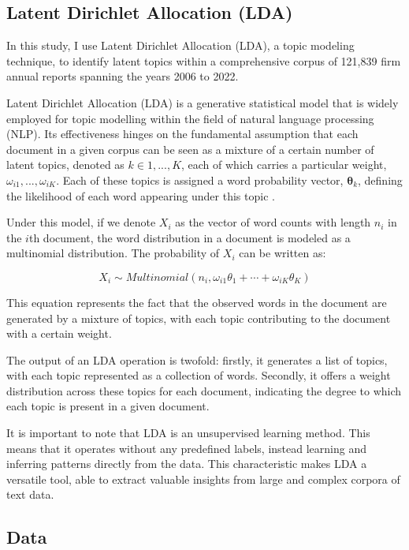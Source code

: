 \documentclass[12pt, letterpaper]{article}
\begin{document}
\subsection{Latent Dirichlet Allocation (LDA)}

In this study, I use Latent Dirichlet Allocation (LDA), a topic modeling technique, to identify latent topics within a comprehensive corpus of 121,839 firm annual reports spanning the years 2006 to 2022. 



Latent Dirichlet Allocation (LDA) is a generative statistical model that is widely employed for topic modelling within the field of natural language processing (NLP). Its effectiveness hinges on the fundamental assumption that each document in a given corpus can be seen as a mixture of a certain number of latent topics, denoted as $k \in {1, ..., K}$, each of which carries a particular weight, $\omega_{i1}, ..., \omega_{iK}$. Each of these topics is assigned a word probability vector, $\mathbf{\theta}_k$, defining the likelihood of each word appearing under this topic \cite{Blei2003-ay}.

Under this model, if we denote $X_i$ as the vector of word counts with length $n_i$ in the $i$th document, the word distribution in a document is modeled as a multinomial distribution. The probability of $X_i$ can be written as:

\begin{equation}
X_i \sim Multinomial\left(n_i, \omega_{i 1} \theta_1+\cdots+\omega_{i K} \theta_K\right)
\end{equation}

This equation represents the fact that the observed words in the document are generated by a mixture of topics, with each topic contributing to the document with a certain weight.

The output of an LDA operation is twofold: firstly, it generates a list of topics, with each topic represented as a collection of words. Secondly, it offers a weight distribution across these topics for each document, indicating the degree to which each topic is present in a given document.

It is important to note that LDA is an unsupervised learning method. This means that it operates without any predefined labels, instead learning and inferring patterns directly from the data. This characteristic makes LDA a versatile tool, able to extract valuable insights from large and complex corpora of text data.

\subsection{Data}
\end{document}
